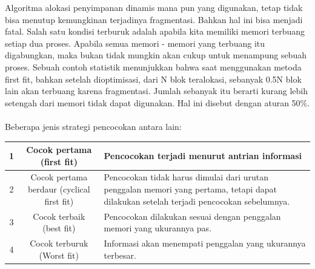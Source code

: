 Algoritma alokasi penyimpanan dinamis mana pun yang digunakan, tetap tidak bisa menutup kemungkinan terjadinya fragmentasi. Bahkan hal ini bisa menjadi fatal. Salah satu kondisi terburuk adalah apabila kita memiliki memori terbuang setiap dua proses. Apabila semua memori - memori yang terbuang itu digabungkan, maka bukan tidak mungkin akan cukup untuk menampung sebuah proses. Sebuah contoh statistik menunjukkan bahwa saat menggunakan metoda first fit, bahkan setelah dioptimisasi, dari N blok teralokasi, sebanyak 0.5N blok lain akan terbuang karena fragmentasi. Jumlah sebanyak itu berarti kurang lebih setengah dari memori tidak dapat digunakan. Hal ini disebut dengan aturan 50\%.
\\
\\
Beberapa jenis strategi pencocokan antara lain:
\begin{table}[h!]
\centering
\begin{tabular}{ |c|c|l| }
\hline
1 & Cocok pertama (first fit) & Pencocokan terjadi menurut antrian informasi \\
\hline
2 & Cocok pertama berdaur (cyclical first fit) &  Pencocokan tidak harus dimulai dari urutan penggalan memori yang pertama, tetapi dapat dilakukan setelah terjadi pencocokan sebelumnya. \\
\hline
3 & Cocok terbaik (best fit) &  Pencocokan dilakukan sesuai dengan penggalan memori yang ukurannya pas. \\
\hline
4 & Cocok terburuk (Worst fit) & Informasi akan menempati penggalan yang ukurannya terbesar. \\
\hline
\end{tabular}
\end{table}
